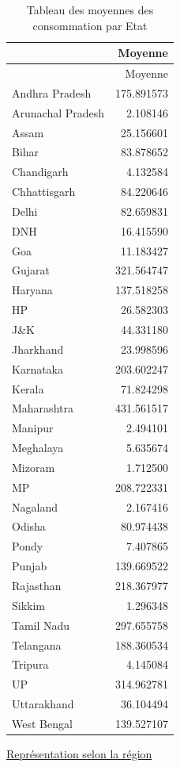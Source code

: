 \documentclass[
]{article}
\begin{document}
\begin{longtable}[]{@{}lr@{}}
\caption{Tableau des moyennes des consommation par Etat}\tabularnewline
\toprule()
& Moyenne \\
\midrule()
\endfirsthead
\toprule()
& Moyenne \\
\midrule()
\endhead
Andhra Pradesh & 175.891573 \\
Arunachal Pradesh & 2.108146 \\
Assam & 25.156601 \\
Bihar & 83.878652 \\
Chandigarh & 4.132584 \\
Chhattisgarh & 84.220646 \\
Delhi & 82.659831 \\
DNH & 16.415590 \\
Goa & 11.183427 \\
Gujarat & 321.564747 \\
Haryana & 137.518258 \\
HP & 26.582303 \\
J\&K & 44.331180 \\
Jharkhand & 23.998596 \\
Karnataka & 203.602247 \\
Kerala & 71.824298 \\
Maharashtra & 431.561517 \\
Manipur & 2.494101 \\
Meghalaya & 5.635674 \\
Mizoram & 1.712500 \\
MP & 208.722331 \\
Nagaland & 2.167416 \\
Odisha & 80.974438 \\
Pondy & 7.407865 \\
Punjab & 139.669522 \\
Rajasthan & 218.367977 \\
Sikkim & 1.296348 \\
Tamil Nadu & 297.655758 \\
Telangana & 188.360534 \\
Tripura & 4.145084 \\
UP & 314.962781 \\
Uttarakhand & 36.104494 \\
West Bengal & 139.527107 \\
\bottomrule()
\end{longtable}

\uline{Représentation selon la région}
\end{document}
